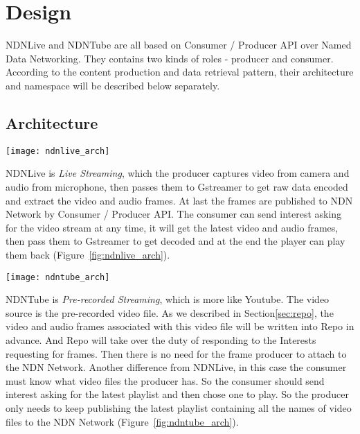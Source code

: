 \vspace{0.3cm}
\section{Design} %
\label{sec:arch}
NDNLive and NDNTube are all based on Consumer / Producer API over Named Data Networking. They contains two kinds of roles - producer and consumer. According to the content production and data retrieval pattern, their architecture and namespace will be described below separately. 

\subsection{Architecture}
\begin{figure*}[htbp]
  \centering
  \texttt{[image: ndnlive\_arch]}
  \caption{NDNLive Architecture}
  \label{fig:ndnlive_arch}
\end{figure*}

NDNLive is \textit{Live Streaming}, which the producer captures video from camera and audio from microphone, then passes them to Gstreamer to get raw data encoded and extract the video and audio frames. At last the frames are published to NDN Network by Consumer / Producer API. The consumer can send interest asking for the video stream at any time, it will get the latest video and audio frames, then pass them to Gstreamer to get decoded and at the end the player can play them back (Figure~\ref{fig:ndnlive_arch}). 

\begin{figure*}[htbp]
  \centering
  \texttt{[image: ndntube\_arch]}
  \caption{NDNTube Architecture}
  \label{fig:ndntube_arch}
\end{figure*}
NDNTube is \textit{Pre-recorded Streaming}, which is more like Youtube. The video source is the pre-recorded video file. As we described in Section\ref{sec:repo}, the video and audio frames associated with this video file will be written into Repo in advance. And Repo will take over the duty of responding to the Interests requesting for frames. Then there is no need for the frame producer to attach to the NDN Network. Another difference from NDNLive, in this case the consumer must know what video files the producer has. So the consumer should send interest asking for the latest playlist and then chose one to play. So the producer only needs to keep publishing the latest playlist containing all the names of video files to the NDN Network (Figure~\ref{fig:ndntube_arch}).

